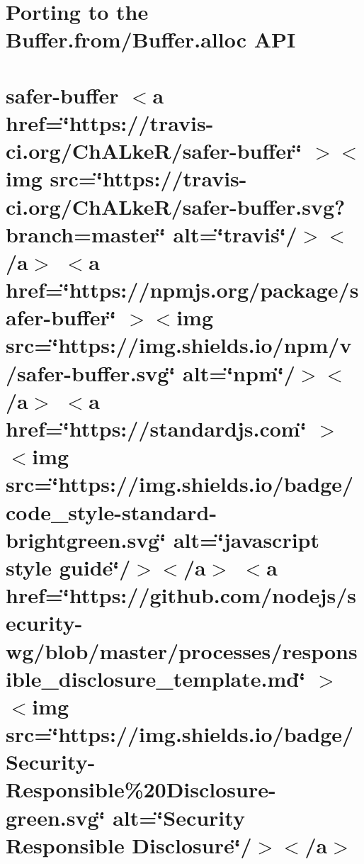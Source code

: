 \documentclass[twoside]{book}
\newcommand{\+}{\discretionary{\mbox{\scriptsize$\hookleftarrow$}}{}{}}
\begin{document}
\chapter{Porting to the Buffer.\+from/\+Buffer.alloc API}
\label{md__c___users_vaishnavi_jadhav__desktop__developer_code_mean_stack_example_server_node_modules_safer_buffer__porting__buffer}

\chapter{safer-\/buffer \texorpdfstring{$<$}{<}a href=\char`\"{}https\+://travis-\/ci.\+org/\+Ch\+ALke\+R/safer-\/buffer\char`\"{} \texorpdfstring{$>$}{>}\texorpdfstring{$<$}{<}img src=\char`\"{}https\+://travis-\/ci.\+org/\+Ch\+ALke\+R/safer-\/buffer.\+svg?branch=master\char`\"{} alt=\char`\"{}travis\char`\"{}/\texorpdfstring{$>$}{>}\texorpdfstring{$<$}{<}/a\texorpdfstring{$>$}{>} \texorpdfstring{$<$}{<}a href=\char`\"{}https\+://npmjs.\+org/package/safer-\/buffer\char`\"{} \texorpdfstring{$>$}{>}\texorpdfstring{$<$}{<}img src=\char`\"{}https\+://img.\+shields.\+io/npm/v/safer-\/buffer.\+svg\char`\"{} alt=\char`\"{}npm\char`\"{}/\texorpdfstring{$>$}{>}\texorpdfstring{$<$}{<}/a\texorpdfstring{$>$}{>} \texorpdfstring{$<$}{<}a href=\char`\"{}https\+://standardjs.\+com\char`\"{} \texorpdfstring{$>$}{>}\texorpdfstring{$<$}{<}img src=\char`\"{}https\+://img.\+shields.\+io/badge/code\+\_\+style-\/standard-\/brightgreen.\+svg\char`\"{} alt=\char`\"{}javascript style guide\char`\"{}/\texorpdfstring{$>$}{>}\texorpdfstring{$<$}{<}/a\texorpdfstring{$>$}{>} \texorpdfstring{$<$}{<}a href=\char`\"{}https\+://github.\+com/nodejs/security-\/wg/blob/master/processes/responsible\+\_\+disclosure\+\_\+template.\+md\char`\"{} \texorpdfstring{$>$}{>}\texorpdfstring{$<$}{<}img src=\char`\"{}https\+://img.\+shields.\+io/badge/\+Security-\/\+Responsible\%20\+Disclosure-\/green.\+svg\char`\"{} alt=\char`\"{}\+Security Responsible Disclosure\char`\"{}/\texorpdfstring{$>$}{>}\texorpdfstring{$<$}{<}/a\texorpdfstring{$>$}{>}}
\label{md__c___users_vaishnavi_jadhav__desktop__developer_code_mean_stack_example_server_node_modules_safer_buffer__readme}

\end{document}
